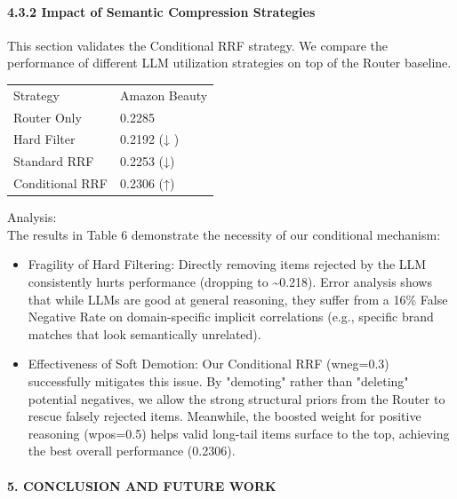 \documentclass[]{article}
\let\oldparagraph\paragraph
\renewcommand{\paragraph}[1]{\oldparagraph{#1}\mbox{}}
\begin{document}
\hypertarget{impact-of-semantic-compression-strategies}{%
\paragraph{4.3.2 Impact of Semantic Compression
Strategies}\label{impact-of-semantic-compression-strategies}}

This section validates the Conditional RRF strategy. We compare the
performance of different LLM utilization strategies on top of the Router
baseline.

\begin{longtable}[]{@{}ll@{}}
\toprule
\endhead
Strategy & Amazon Beauty\tabularnewline
Router Only & 0.2285\tabularnewline
Hard Filter & 0.2192 (↓ )\tabularnewline
Standard RRF & 0.2253 (↓)\tabularnewline
Conditional RRF & 0.2306 (↑)\tabularnewline
\bottomrule
\end{longtable}

Analysis:\\
The results in Table 6 demonstrate the necessity of our conditional
mechanism:

\begin{itemize}
\item
  Fragility of Hard Filtering: Directly removing items rejected by the
  LLM consistently hurts performance (dropping to
  \textasciitilde{}0.218). Error analysis shows that while LLMs are good
  at general reasoning, they suffer from a 16\% False Negative Rate on
  domain-specific implicit correlations (e.g., specific brand matches
  that look semantically unrelated).
\end{itemize}

\begin{itemize}
\item
  Effectiveness of Soft Demotion: Our Conditional RRF (wneg=0.3)
  successfully mitigates this issue. By "demoting" rather than
  "deleting" potential negatives, we allow the strong structural priors
  from the Router to rescue falsely rejected items. Meanwhile, the
  boosted weight for positive reasoning (wpos=0.5) helps valid long-tail
  items surface to the top, achieving the best overall performance
  (0.2306).
\end{itemize}

\hypertarget{conclusion-and-future-work}{%
\paragraph{5. CONCLUSION AND FUTURE
WORK}\label{conclusion-and-future-work}}
\end{document}
